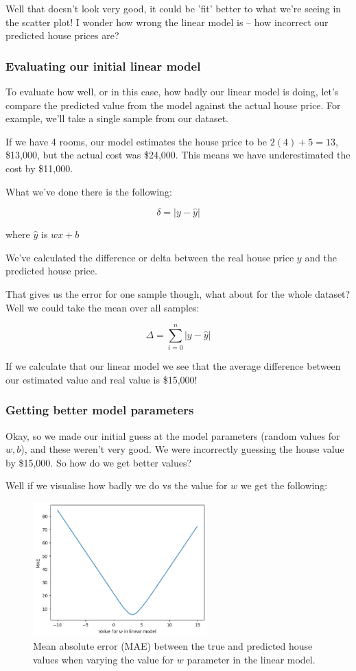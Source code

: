 \documentclass[10pt]{beamer}
\begin{document}
Well that doesn't look very good, it could be 'fit' better to what we're seeing in
the scatter plot! I wonder how wrong the linear model is -- how incorrect our
predicted house prices are?

\subsubsection*{Evaluating our initial linear model}
\label{sec:org8d7e59c}
To evaluate how well, or in this case, how badly our linear model is doing, let's
compare the predicted value from the model against the actual house price. For
example, we'll take a single sample from our dataset.

If we have 4 rooms, our model estimates the house price to be \(2(4) + 5 = 13\),
\$13,000, but the actual cost was \$24,000. This means we have underestimated the cost
by \$11,000.

What we've done there is the following:

\[
\delta = | y - \hat{y} |
\]

where \(\hat{y}\) is \(w x + b\)

We've calculated the difference or delta between the real house price \(y\) and the
predicted house price.

That gives us the error for one sample though, what about for the whole dataset? Well
we could take the mean over all samples:

\[
\Delta = \sum_{i=0}^n | y - \hat{y} |
\]

If we calculate that our linear model we see that the average difference between our
estimated value and real value is \$15,000!

\subsubsection*{Getting better model parameters}
\label{sec:orgc134c1d}
Okay, so we made our initial guess at the model parameters (random values for \(w,
b\)), and these weren't very good. We were incorrectly guessing the house value by
\$15,000. So how do we get better values?

Well if we visualise how badly we do vs the value for \(w\) we get the following:

\begin{figure}[htbp]
\centering
\includegraphics[width=0.6\textwidth]{images/plot_linear_model_loss_w.png}
\caption{\label{fig:mae_lm}Mean absolute error (MAE) between the true and predicted house values when varying the value for \(w\) parameter in the linear model.}
\end{figure}
\end{document}
